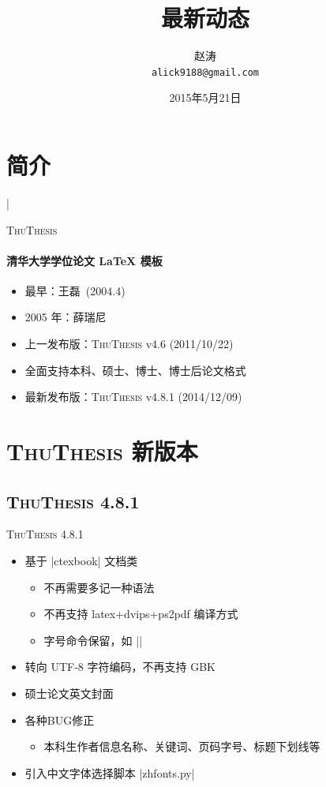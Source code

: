 \documentclass[xcolor=table,dvipsnames,svgnames]{beamer}
\title
{\ThuThesis 最新动态}
\author[alick] %
{赵涛\\ \texttt{alick9188@gmail.com}}
\institute[TUNA] %
{
  清华大学电子系网络融合实验室
}
\date
{2015年5月21日}
\newcommand{\ThuThesis}{\textsc{ThuThesis}\xspace}
\begin{document}
\begin{frame}
  \titlepage
\end{frame}



\section{简介}

\lstMakeShortInline|

\begin{frame}{\ThuThesis}
  \framesubtitle{清华大学学位论文 \LaTeX{} 模板}
  \begin{itemize}
  \item 最早：王磊~(2004.4)
  \item 2005 年：薛瑞尼
  \item 上一发布版：\ThuThesis v4.6 (2011/10/22)
  \item 全面支持本科、硕士、博士、博士后论文格式
  \item 最新发布版：\ThuThesis v4.8.1 (2014/12/09)
  \end{itemize}
\end{frame}
\section{\ThuThesis 新版本}
\subsection{\ThuThesis 4.8.1}
\begin{frame}[fragile]{\ThuThesis 4.8.1}
  \begin{itemize}
    \item 基于 |ctexbook| 文档类
      \begin{itemize}
        \item 不再需要多记一种语法
        \item 不再支持 latex+dvips+ps2pdf 编译方式
        \item 字号命令保留，如 |\banxiaosi[1.3]|
      \end{itemize}
    \item 转向 UTF-8 字符编码，不再支持 GBK
    \item 硕士论文英文封面
    \item 各种BUG修正
      \begin{itemize}
        \item 本科生作者信息名称、关键词、页码字号、标题下划线等
      \end{itemize}
    \item 引入中文字体选择脚本 |zhfonts.py|
  \end{itemize}
\end{frame}
\end{document}
